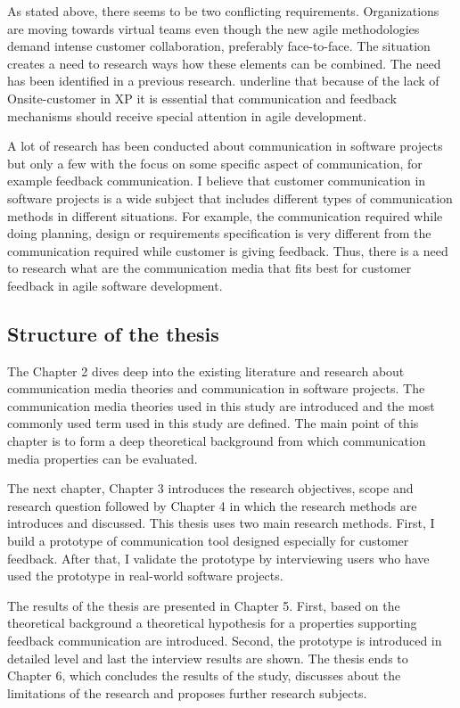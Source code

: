 \documentclass[english,12pt,a4paper,pdftex]{article}
\begin{document}
As stated above, there seems to be two conflicting requirements. Organizations are moving towards virtual teams even though the new agile methodologies demand intense customer collaboration, preferably face-to-face. The situation creates a need to research ways how these elements can be combined. The need has been identified in a previous research. \citet{korkala2006} underline that because of the lack of Onsite-customer in \ac{XP} it is essential that communication and feedback mechanisms should receive special attention in agile development.

A lot of research has been conducted about communication in software projects but only a few with the focus on some specific aspect of communication, for example feedback communication. I believe that customer communication in software projects is a wide subject that includes different types of communication methods in different situations. For example, the communication required while doing planning, design or requirements specification is very different from the communication required while customer is giving feedback. Thus, there is a need to research what are the communication media that fits best for customer feedback in agile software development.

\subsection{Structure of the thesis}

The Chapter 2 dives deep into the existing literature and research about communication media theories and communication in software projects. The communication media theories used in this study are introduced and the most commonly used term used in this study are defined. The main point of this chapter is to form a deep theoretical background from which communication media properties can be evaluated.

The next chapter, Chapter 3 introduces the research objectives, scope and research question followed by Chapter 4 in which the research methods are introduces and discussed. This thesis uses two main research methods. First, I build a  prototype of communication tool designed especially for customer feedback. After that, I validate the prototype by interviewing users who have used the prototype in real-world software projects.

The results of the thesis are presented in Chapter 5. First, based on the theoretical background a theoretical hypothesis for a properties supporting feedback communication are introduced. Second, the prototype is introduced in detailed level and last the interview results are shown. The thesis ends to Chapter 6, which concludes the results of the study, discusses about the limitations of the research and proposes further research subjects.
\end{document}

